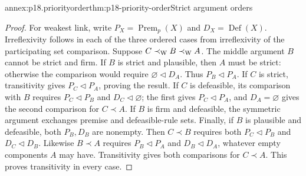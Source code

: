 \begin{annexitem}{annex:p18.priorityorder}{thm:p18-priority-order}{Strict argument orders}
\begin{proof}
For weakest link, write \(P_X=\operatorname{Prem}_p(X)\) and
\(D_X=\operatorname{Def}(X)\).
Irreflexivity follows in each of the three ordered cases from
irreflexivity of the participating set comparison.
Suppose \(C\prec_{\rm W}B\prec_{\rm W}A\).
The middle argument \(B\) cannot be strict and firm.
If \(B\) is strict and plausible, then \(A\) must be strict:
otherwise the comparison would require
\(\varnothing\triangleleft D_A\).
Thus \(P_B\triangleleft P_A\).
If \(C\) is strict, transitivity gives
\(P_C\triangleleft P_A\), proving the result.
If \(C\) is defeasible, its comparison with \(B\) requires
\(P_C\triangleleft P_B\) and \(D_C\triangleleft\varnothing\);
the first gives \(P_C\triangleleft P_A\), and \(D_A=\varnothing\)
gives the second comparison for \(C\prec A\).
If \(B\) is firm and defeasible, the symmetric argument exchanges
premise and defeasible-rule sets.
Finally, if \(B\) is plausible and defeasible, both \(P_B,D_B\)
are nonempty. Then \(C\prec B\) requires both
\(P_C\triangleleft P_B\) and \(D_C\triangleleft D_B\).
Likewise \(B\prec A\) requires
\(P_B\triangleleft P_A\) and \(D_B\triangleleft D_A\), whatever
empty components \(A\) may have. Transitivity gives both comparisons
for \(C\prec A\). This proves transitivity in every case.
\end{proof}
\end{annexitem}

